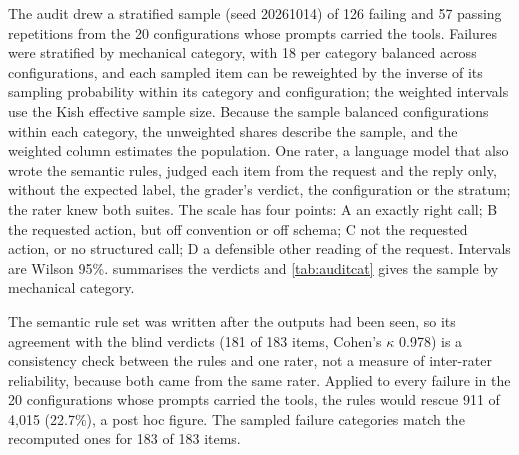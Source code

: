 \documentclass[11pt]{article}
\begin{document}
The audit drew a stratified sample (seed 20261014) of 126 failing and 57 passing repetitions from the 20 configurations whose prompts carried the tools. Failures were stratified by mechanical category, with 18 per category balanced across configurations, and each sampled item can be reweighted by the inverse of its sampling probability within its category and configuration; the weighted intervals use the Kish effective sample size. Because the sample balanced configurations within each category, the unweighted shares describe the sample, and the weighted column estimates the population. One rater, a language model that also wrote the semantic rules, judged each item from the request and the reply only, without the expected label, the grader's verdict, the configuration or the stratum; the rater knew both suites. The scale has four points: A an exactly right call; B the requested action, but off convention or off schema; C not the requested action, or no structured call; D a defensible other reading of the request. Intervals are Wilson 95\%.  summarises the verdicts and \cref{tab:auditcat} gives the sample by mechanical category.

The semantic rule set was written after the outputs had been seen, so its agreement with the blind verdicts (181 of 183 items, Cohen's $\kappa$ 0.978) is a consistency check between the rules and one rater, not a measure of inter-rater reliability, because both came from the same rater. Applied to every failure in the 20 configurations whose prompts carried the tools, the rules would rescue 911 of 4,015 (22.7\%), a post hoc figure. The sampled failure categories match the recomputed ones for 183 of 183 items.
\end{document}
